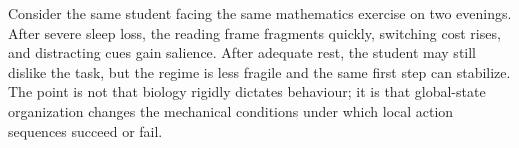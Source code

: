 \begin{example}
Consider the same student facing the same mathematics exercise on two
evenings. After severe sleep loss, the reading frame fragments quickly,
switching cost rises, and distracting cues gain salience. After adequate rest,
the student may still dislike the task, but the regime is less fragile and the
same first step can stabilize. The point is not that biology rigidly dictates
behaviour; it is that global-state organization changes the mechanical
conditions under which local action sequences succeed or fail.
\end{example}
